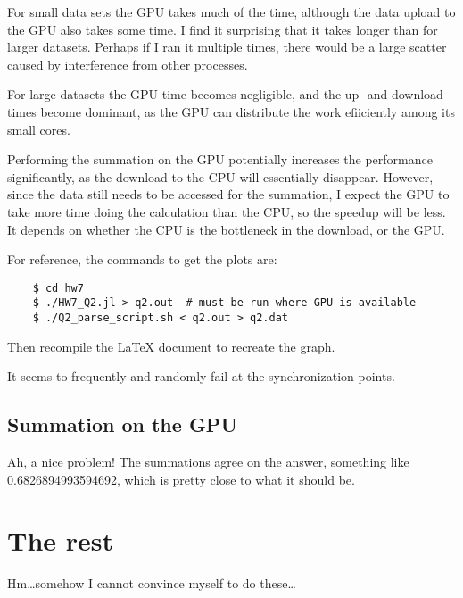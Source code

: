 \documentclass[11pt]{article}
\begin{document}
For small data sets the GPU takes much of the time, although the data upload to
the GPU also takes some time. I find it surprising that it takes longer than
for larger datasets. Perhaps if I ran it multiple times, there would be a large
scatter caused by interference from other processes.

For large datasets the GPU time becomes negligible, and the up- and download
times become dominant, as the GPU can distribute the work efiiciently among its
small cores.

Performing the summation on the GPU potentially increases the performance
significantly, as the download to the CPU will essentially disappear. However,
since the data still needs to be accessed for the summation, I expect the GPU
to take more time doing the calculation than the CPU, so the speedup will be
less. It depends on whether the CPU is the bottleneck in the download, or the
GPU.

For reference, the commands to get the plots are:
\begin{center}
\begin{verbatim}
    $ cd hw7
    $ ./HW7_Q2.jl > q2.out  # must be run where GPU is available
    $ ./Q2_parse_script.sh < q2.out > q2.dat
\end{verbatim}
\end{center}
Then recompile the \LaTeX{} document  to recreate the graph.

It seems to frequently and randomly fail at the synchronization points.


\subsection{Summation on the GPU}

Ah, a nice problem! The summations agree on the answer, something like
\num{0.6826894993594692}, which is pretty close to what it should be.



\section{The rest}

Hm\ldots somehow I cannot convince myself to do these\ldots
\end{document}
